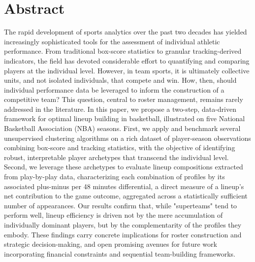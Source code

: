 \section*{Abstract}

The rapid development of sports analytics over the past two decades has yielded increasingly sophisticated tools for the assessment of individual athletic performance. 
From traditional box-score statistics to granular tracking-derived indicators, the field has devoted considerable effort to quantifying and comparing players at the individual level. 
However, in team sports, it is ultimately collective units, and not isolated individuals, that compete and win. 
How, then, should individual performance data be leveraged to inform the construction of a competitive team? 
This question, central to roster management, remains rarely addressed in the literature.
In this paper, we propose a two-step, data-driven framework for optimal lineup building in basketball, illustrated on five National Basketball Association (NBA) seasons. 
First, we apply and benchmark several unsupervised clustering algorithms on a rich dataset of player-season observations combining box-score and tracking statistics, with the objective of identifying robust, interpretable player archetypes that transcend the individual level. 
Second, we leverage these archetypes to evaluate lineup compositions extracted from play-by-play data, characterizing each combination of profiles by its associated plus-minus per 48 minutes differential, a direct measure of a lineup's net contribution to the game outcome, aggregated across a statistically sufficient number of appearances.
Our results confirm that, while "superteams" tend to perform well, lineup efficiency is driven not by the mere accumulation of individually dominant players, but by the complementarity of the profiles they embody. 
These findings carry concrete implications for roster construction and strategic decision-making, and open promising avenues for future work incorporating financial constraints and sequential team-building frameworks.